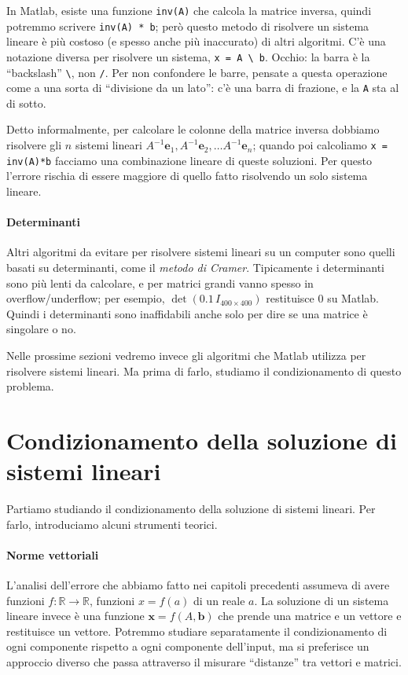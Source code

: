 \documentclass[a4paper]{report}
\theoremstyle{definition}
\theoremstyle{remark}
\begin{document}
In Matlab, esiste una funzione \lstinline{inv(A)} che calcola la matrice inversa, quindi potremmo scrivere \lstinline{inv(A) * b}; però questo metodo di risolvere un sistema lineare è più costoso (e spesso anche più inaccurato) di altri algoritmi. C'è una notazione diversa per risolvere un sistema, \lstinline{x = A \ b}. Occhio: la barra è la ``backslash'' \lstinline!\!, non \lstinline{/}. Per non confondere le barre, pensate a questa operazione come a una sorta di ``divisione da un lato'': c'è una barra di frazione, e la \lstinline{A} sta al di sotto.

Detto informalmente, per calcolare le colonne della matrice inversa dobbiamo risolvere gli $n$ sistemi lineari $A^{-1}\mathbf{e}_1, A^{-1}\mathbf{e}_2,\dots A^{-1}\mathbf{e}_n$; quando poi calcoliamo \texttt{x = inv(A)*b} facciamo una combinazione lineare di queste soluzioni. Per questo l'errore rischia di essere maggiore di quello fatto risolvendo un solo sistema lineare.

\paragraph{Determinanti} Altri algoritmi da evitare per risolvere sistemi lineari su un computer sono quelli basati su determinanti, come il \emph{metodo di Cramer}. Tipicamente i determinanti sono più lenti da calcolare, e per matrici grandi vanno spesso in overflow/underflow; per esempio, $\det(0.1\, I_{400\times 400})$ restituisce $0$ su Matlab. Quindi i determinanti sono inaffidabili anche solo per dire se una matrice è singolare o no. 

Nelle prossime sezioni vedremo invece gli algoritmi che Matlab utilizza per risolvere sistemi lineari. Ma prima di farlo, studiamo il condizionamento di questo problema.

\section{Condizionamento della soluzione di sistemi lineari}

Partiamo studiando il condizionamento della soluzione di sistemi lineari. Per farlo, introduciamo alcuni strumenti teorici.

\paragraph{Norme vettoriali} L'analisi dell'errore che abbiamo fatto nei capitoli precedenti assumeva di avere funzioni $f: \mathbb{R} \to \mathbb{R}$, funzioni $x=f(a)$ di un reale $a$. La soluzione di un sistema lineare invece è una funzione $\mathbf{x} = f(A,\mathbf{b})$ che prende una matrice e un vettore e restituisce un vettore. Potremmo studiare separatamente il condizionamento di ogni componente rispetto a ogni componente dell'input, ma si preferisce un approccio diverso che passa attraverso il misurare ``distanze'' tra vettori e matrici.
\end{document}
